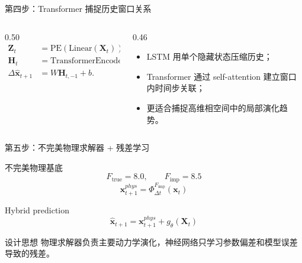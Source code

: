 \documentclass[UTF8,aspectratio=169,11pt]{ctexbeamer}
\newcommand{\xvec}{\mathbf{x}}
\newcommand{\Xwin}{\mathbf{X}}
\newcommand{\dt}{\Delta t}
\begin{document}
\begin{frame}{第四步：Transformer 捕捉历史窗口关系}
    \begin{columns}[T,onlytextwidth]
        \begin{column}{0.50\textwidth}
            \begin{align*}
            \mathbf{Z}_t &= \mathrm{PE}(\mathrm{Linear}(\Xwin_t)),\\
            \mathbf{H}_t &= \mathrm{TransformerEncoder}(\mathbf{Z}_t),\\
            \Delta\hat{\xvec}_{t+1} &= W\mathbf{H}_{t,-1}+b.
            \end{align*}
        \end{column}
        \begin{column}{0.46\textwidth}
            \begin{itemize}
                \item LSTM 用单个隐藏状态压缩历史；
                \item Transformer 通过 self-attention 建立窗口内时间步关联；
                \item 更适合捕捉高维相空间中的局部演化趋势。
            \end{itemize}
        \end{column}
    \end{columns}
\end{frame}

\begin{frame}{第五步：不完美物理求解器 + 残差学习}
    \begin{block}{不完美物理基底}
        \[
        F_{\mathrm{true}}=8.0,\qquad F_{\mathrm{imp}}=8.5
        \]
        \[
        \xvec^{phys}_{t+1}=\Phi_{\dt}^{F_{\mathrm{imp}}}(\xvec_t)
        \]
    \end{block}
    \begin{block}{Hybrid prediction}
        \[
        \hat{\xvec}_{t+1}
        =
        \xvec^{phys}_{t+1}
        +
        g_\theta(\Xwin_t)
        \]
    \end{block}
    \begin{alertblock}{设计思想}
        物理求解器负责主要动力学演化，神经网络只学习参数偏差和模型误差导致的残差。
    \end{alertblock}
\end{frame}
\end{document}
